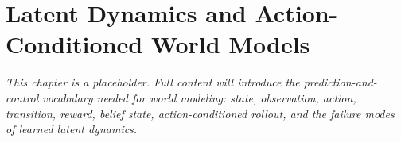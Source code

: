 \chapter{Latent Dynamics and Action-Conditioned World Models}
\label{ch:latent-dynamics-action}


\textit{This chapter is a placeholder. Full content will introduce the prediction-and-control vocabulary needed for world modeling: state, observation, action, transition, reward, belief state, action-conditioned rollout, and the failure modes of learned latent dynamics.}
